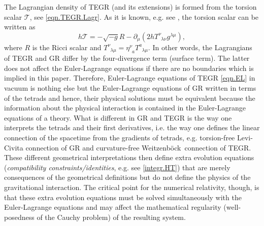 \documentclass[
10pt, %
a4paper, %
oneside, %
twocolumn,
headinclude,footinclude, %
BCOR5mm, %
]{scrartcl}
\newcommand{\pd}[1]{\partial_{#1}}
\newcommand{\itetrsymbol}{\eta}
\newcommand{\itetr}[2]{\itetrsymbol^{#1}_{\phantom{#1}#2}}
\newcommand{\Tors}[2]{T^{#1}_{\phantom{#1}#2}}
\newcommand{\We}{Weitzenb\"ock}
\newcommand{\Tscal}{\mathcal{T}}		%
\begin{document}
	The Lagrangian density of TEGR (and its extensions) is formed from the torsion scalar $ \Tscal 
	$, see \eqref{eqn.TEGR.Lagr}. As it is known, e.g. see \cite[Eq.(9.30)]{AldrovandiPereiraBook}, 
	the 
	torsion scalar can be written as
	\begin{equation}\label{eqn.TR}
		h \Tscal = -\sqrt{-g} R - \pd{\mu}(2 h \Tors{\nu}{\lambda\nu}g^{\lambda
			\mu}),
	\end{equation}
	where $ R $ is the Ricci scalar and $ \Tors{\nu}{\lambda\mu} = \itetr{\nu}{a} 
	\Tors{a}{\lambda\mu} 
	$. In other words, the Lagrangians of TEGR and GR differ by the four-divergence term (surface 
	term). The latter does not affect the Euler-Lagrange equations if there are no boundaries which 
	is 
	implied in this paper. 
	Therefore, Euler-Lagrange equations of TEGR \eqref{eqn.EL} in vacuum is nothing else but the 
	Euler-Lagrange 
	equations of GR written in terms of the tetrads and hence, their physical solutions must be 
	equivalent because the information about the physical interaction is contained in the 
	Euler-Lagrange equations of a theory. What is different in GR and TEGR is the 
	way one interprets the tetrads and their first derivatives, i.e. the way one defines the linear 
	connection of the spacetime from the gradients of tetrads, e.g. torsion-free Levi-Civita 
	connection 
	of GR and curvature-free \We\ connection of TEGR. These different geometrical 
	interpretations then define extra evolution equations (\emph{compatibility 
	constraints/identities}, 
	e.g. see \eqref{integr.HT}) 
	that are merely consequences of the geometrical definitions but do not define the physics of 
	the 
	gravitational interaction. %
	The critical point for the numerical relativity, though, is that these extra evolution 
	equations 
	must be solved simultaneously with the Euler-Lagrange equations and may affect the mathematical 
	regularity (well-posedness of the Cauchy problem) of the resulting system. 
	
	
\end{document}
